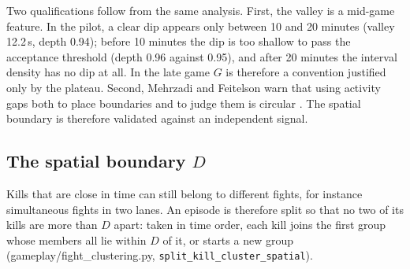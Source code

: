 Two qualifications follow from the same analysis. First, the valley is a mid-game feature. In the
pilot, a clear dip appears only between 10 and 20 minutes (valley 12.2\,s, depth 0.94); before
10 minutes the dip is too shallow to pass the acceptance threshold (depth 0.96 against 0.95), and
after 20 minutes the interval density has no dip at all. In the late game $G$ is therefore a convention
justified only by the plateau.
Second, Mehrzadi and Feitelson warn that using activity gaps both to place boundaries and to judge
them is circular \cite{mehrzadi2012session}. The spatial boundary is therefore validated against an
independent signal.

\subsection{The spatial boundary \texorpdfstring{$D$}{D}}

Kills that are close in time can still belong to different fights, for instance simultaneous fights in
two lanes. An episode is therefore split so that no two of its kills are more than $D$ apart: taken in
time order, each kill joins the first group whose members all lie within $D$ of it, or starts a new
group (gameplay/fight\_clustering.py, \texttt{split\_kill\_cluster\_spatial}).


